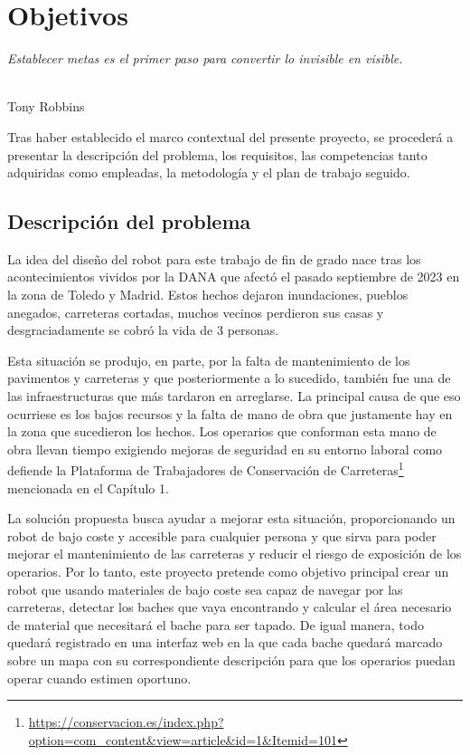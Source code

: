 \chapter{Objetivos}
\label{cap:capitulo3}

\begin{flushright}
\begin{minipage}[]{10cm}
\emph{Establecer metas es el primer paso para convertir lo invisible en visible.}\\
\end{minipage}\\

Tony Robbins\\
\end{flushright}

\vspace{1cm}
\setcounter{footnote}{29} 

Tras haber establecido el marco contextual del presente proyecto, se procederá a presentar la descripción del problema, los requisitos, las competencias tanto adquiridas como empleadas, la metodología y el plan de trabajo seguido.

\section{Descripción del problema}
\label{sec:descripcion}

La idea del diseño del robot para este trabajo de fin de grado nace tras los acontecimientos vividos por la \ac{DANA} que afectó el pasado septiembre de 2023 en la zona de Toledo y Madrid. Estos hechos dejaron inundaciones, pueblos anegados, carreteras cortadas, muchos vecinos perdieron sus casas y desgraciadamente se cobró la vida de 3 personas. 

Esta situación se produjo, en parte, por la falta de mantenimiento de los pavimentos y carreteras y que posteriormente a lo sucedido, también fue una de las infraestructuras que más tardaron en arreglarse. La principal causa de que eso ocurriese es los bajos recursos y la falta de mano de obra que justamente hay en la zona que sucedieron los hechos. Los operarios que conforman esta mano de obra llevan tiempo exigiendo mejoras de seguridad en su entorno laboral como defiende la Plataforma de Trabajadores de Conservación de Carreteras\footnote{\url{https://conservacion.es/index.php?option=com_content&view=article&id=1&Itemid=101}} mencionada en el Capítulo 1.  
   
La solución propuesta busca ayudar a mejorar esta situación, proporcionando un robot de bajo coste y accesible para cualquier persona y que sirva para poder mejorar el mantenimiento de las carreteras y reducir el riesgo de exposición de los operarios. Por lo tanto, este proyecto pretende como objetivo principal crear un robot que usando materiales de bajo coste sea capaz de navegar por las carreteras, detectar los baches que vaya encontrando y calcular el área necesario de material que necesitará el bache para ser tapado. De igual manera, todo quedará registrado en una interfaz web en la que cada bache quedará marcado sobre un mapa con su correspondiente descripción para que los operarios puedan operar cuando estimen oportuno.

